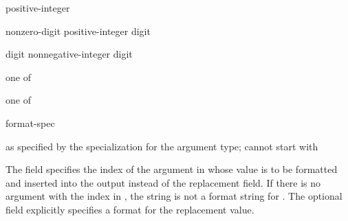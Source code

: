\begin{ncbnf}
\br
    \terminal{\{}   \terminal{\}}
\end{ncbnf}

\begin{ncbnf}
\br
    \br
    positive-integer
\end{ncbnf}

\begin{ncbnf}
\br
    nonzero-digit\br
    positive-integer digit
\end{ncbnf}

\begin{ncbnf}
\br
    digit\br
    nonnegative-integer digit
\end{ncbnf}

\begin{ncbnf}
 \textnormal{one of}\br
\end{ncbnf}

\begin{ncbnf}
 \textnormal{one of}\br
\end{ncbnf}

\begin{ncbnf}
\br
    \terminal{:} format-spec
\end{ncbnf}

\begin{ncbnf}
\br
    \textnormal{as specified by the  specialization for the argument type; cannot start with \terminal{\}} }
\end{ncbnf}

\pnum
The  field specifies the index of
the argument in 
whose value is to be formatted and inserted into the output
instead of the replacement field.
If there is no argument with
the index  in ,
the string is not a format string for .
The optional  field
explicitly specifies a format for the replacement value.

\pnum
\begin{example}
\begin{codeblock}
string s = format("{0}-{{", 8);         // value of  is 
\end{codeblock}
\end{example}

